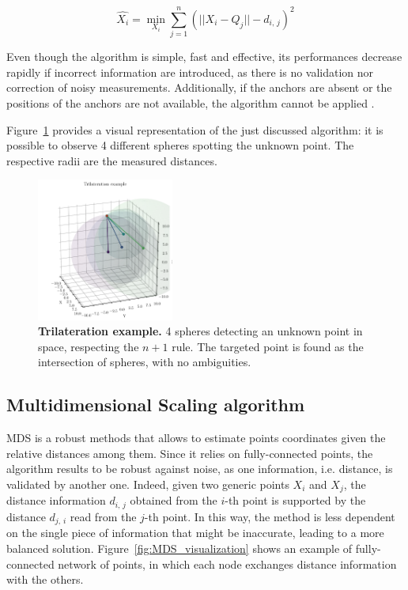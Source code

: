 \begin{equation}
    \label{eq:LSE_equation}
    \hat{X_i} = \min_{X_i} \sum_{j=1}^{n} \left( ||X_i - Q_j|| - d_{i,\,j} \right)^2
\end{equation}

Even though the algorithm is simple, fast and effective, its performances decrease rapidly if incorrect information are introduced, as there is no validation nor correction of noisy measurements. Additionally, if the anchors are absent or the positions of the anchors are not available, the algorithm cannot be applied \cite{Li2021CooperativeNodes}. \par

Figure~\ref{fig:trilateration} provides a visual representation of the just discussed algorithm: it is possible to observe 4 different spheres spotting the unknown point. The respective radii are the measured distances.

\begin{figure}[!ht]
    \centering
    \includegraphics[width=0.4\textwidth]{figures/trilateration.pdf}
    \caption[Trilateration example.]{\textbf{Trilateration example.} 4 spheres detecting an unknown point in space, respecting the $n+1$ rule. The targeted point is found as the intersection of spheres, with no ambiguities.}
    \label{fig:trilateration}
\end{figure}


\subsection{Multidimensional Scaling algorithm}\label{sec:MDS}
MDS is a robust methods that allows to estimate points coordinates given the relative distances among them. Since it relies on fully-connected points, the algorithm results to be robust against noise, as one information, i.e. distance, is validated by another one. Indeed, given two generic points $X_i$ and $X_j$, the distance information $d_{i,\,j}$ obtained from the $i$-th point is supported by the distance $d_{j,\,i}$ read from the $j$-th point. In this way, the method is less dependent on the single piece of information that might be inaccurate, leading to a more balanced solution. Figure~\ref{fig:MDS_visualization} shows an example of fully-connected network of points, in which each node exchanges distance information with the others.\par


